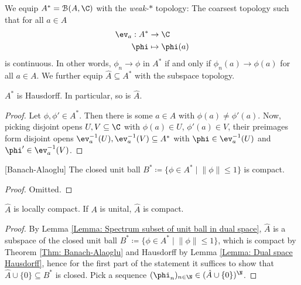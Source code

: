 \documentclass[american]{scrartcl}
\renewcommand{\norm}[1]{\left\lVert #1 \right\rVert}
\newcommand{\cB}{\mathcal{B}}
\newcommand{\inv}{^{-1}}
\begin{document}
\begin{definition}
	We equip $A^*=\cB(A,\C)$ with the \textit{weak-$*$} topology: The coarsest topology such that for all $a\in A$
	\begin{align*}
		\ev_a:A^*&\to \C\\
		\phi &\mapsto \phi(a)
	\end{align*}
	is continuous. In other words, $\phi_n\to \phi$ in $A^*$ if and only if $\phi_n(a)\to \phi(a)$ for all $a\in A$.
	We further equip $\hat{A}\subseteq A^*$ with the subspace topology.
\end{definition}
\begin{lemma}\label{Lemma: Dual space Hausdorff}
	$A^*$ is Hausdorff. In particular, so is $\hat{A}$.
\end{lemma}
\begin{proof}
	Let $\phi,\phi'\in A^*$. Then there is some $a\in A$ with $\phi(a)\neq \phi'(a)$. Now, picking disjoint opens $U, V\subseteq \C$ with $\phi(a)\in U$, $\phi'(a)\in V$, their preimages form disjoint opens $\ev_a\inv(U), \ev_a\inv(V)\subseteq A^*$ with $\phi\in \ev_a\inv(U)$ and $\phi'\in \ev_a\inv(V)$.
\end{proof}
\begin{theorem}\label{Thm: Banach-Alaoglu}[Banach-Alaoglu]
	The closed unit ball $B^*\coloneqq \{\phi\in A^*\mid \norm{\phi}\leq 1\}$ is compact.
\end{theorem}
\begin{proof}
	Omitted.
\end{proof}
\begin{proposition}
	$\hat{A}$ is locally compact. If $A$ is unital, $\hat{A}$ is compact.
\end{proposition}
\begin{proof}
	By Lemma \ref{Lemma: Spectrum subset of unit ball in dual space}, $\hat{A}$ is a subspace of the closed unit ball $B^*\coloneqq \{\phi\in A^*\mid \norm{\phi}\leq 1\}$, which is compact by Theorem \ref{Thm: Banach-Alaoglu} and Hausdorff by Lemma \ref{Lemma: Dual space Hausdorff}, hence for the first part of the statement it suffices to show that $\hat{A}\cup \{0\}\subseteq B^*$ is closed. Pick a sequence $(\phi_n)_{n\in \N}\in (\hat{A}\cup\{0\})^{\N}$.
\end{proof}
\end{document}
